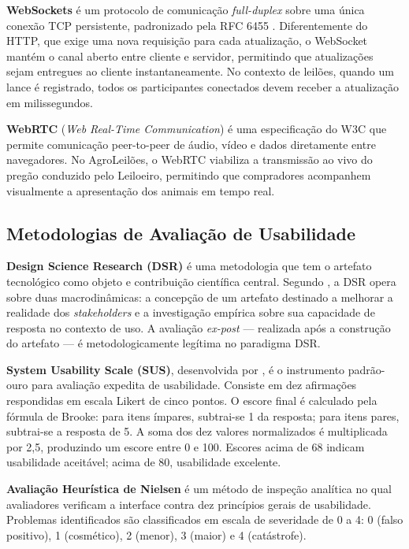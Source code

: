 \documentclass[12pt]{article}
\begin{document}
\textbf{WebSockets} é um protocolo de comunicação \textit{full-duplex} sobre uma única
conexão TCP persistente, padronizado pela RFC 6455 \cite{fette2011}. Diferentemente do
HTTP, que exige uma nova requisição para cada atualização, o WebSocket mantém o canal
aberto entre cliente e servidor, permitindo que atualizações sejam entregues ao cliente
instantaneamente. No contexto de leilões, quando um lance é registrado, todos os
participantes conectados devem receber a atualização em milissegundos.

\textbf{WebRTC} (\textit{Web Real-Time Communication}) é uma especificação do W3C
\cite{w3c2021} que permite comunicação peer-to-peer de áudio, vídeo e dados diretamente
entre navegadores. No AgroLeilões, o WebRTC viabiliza a transmissão ao vivo do pregão
conduzido pelo Leiloeiro, permitindo que compradores acompanhem visualmente a
apresentação dos animais em tempo real.

\subsection{Metodologias de Avaliação de Usabilidade}

\textbf{Design Science Research (DSR)} é uma metodologia que tem o artefato tecnológico
como objeto e contribuição científica central. Segundo \cite{wieringa2014}, a DSR opera
sobre duas macrodinâmicas: a concepção de um artefato destinado a melhorar a realidade
dos \textit{stakeholders} e a investigação empírica sobre sua capacidade de resposta no
contexto de uso. A avaliação \textit{ex-post} --- realizada após a construção do artefato
--- é metodologicamente legítima no paradigma DSR.

\textbf{System Usability Scale (SUS)}, desenvolvida por \cite{brooke1996}, é o
instrumento padrão-ouro para avaliação expedita de usabilidade. Consiste em dez
afirmações respondidas em escala Likert de cinco pontos. O escore final é calculado pela
fórmula de Brooke: para itens ímpares, subtrai-se 1 da resposta; para itens pares,
subtrai-se a resposta de 5. A soma dos dez valores normalizados é multiplicada por 2,5,
produzindo um escore entre 0 e 100. Escores acima de 68 indicam usabilidade aceitável;
acima de 80, usabilidade excelente.

\textbf{Avaliação Heurística de Nielsen} \cite{nielsen1994} é um método de inspeção
analítica no qual avaliadores verificam a interface contra dez princípios gerais de
usabilidade. Problemas identificados são classificados em escala de severidade de 0 a 4:
0 (falso positivo), 1 (cosmético), 2 (menor), 3 (maior) e 4 (catástrofe).
\end{document}
